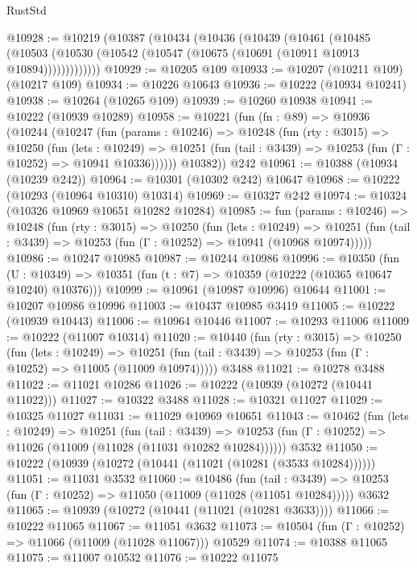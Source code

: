 \begin{lexlean}{RustStd}
\begin{coremodule}
@10928 := @10219
    (@10387
      (@10434
        (@10436
          (@10439
            (@10461
              (@10485
                (@10503 (@10530 (@10542 (@10547 (@10675 (@10691 (@10911 @10913 @10894)))))))))))))
@10929 := @10205 @109
@10933 := @10207 (@10211 @109) (@10217 @109)
@10934 := @10226 @10643
@10936 := @10222 (@10934 @10241)
@10938 := @10264 (@10265 @109)
@10939 := @10260 @10938
@10941 := @10222 (@10939 @10289)
@10958 := @10221
    (fun (fn : @89) =>
    @10936
      (@10244
        (@10247
          (fun (params : @10246) =>
          @10248
            (fun (rty : @3015) =>
            @10250
              (fun (lets : @10249) =>
              @10251 (fun (tail : @3439) => @10253 (fun (Γ : @10252) => @10941 @10336))))))
        @10382))
    @242
@10961 := @10388 (@10934 (@10239 @242))
@10964 := @10301 (@10302 @242) @10647
@10968 := @10222 (@10293 (@10964 @10310) @10314)
@10969 := @10327 @242
@10974 := @10324 (@10326 @10969 @10651 @10282 @10284)
@10985 := fun (params : @10246) =>
  @10248
    (fun (rty : @3015) =>
    @10250
      (fun (lets : @10249) =>
      @10251 (fun (tail : @3439) => @10253 (fun (Γ : @10252) => @10941 (@10968 @10974)))))
@10986 := @10247 @10985
@10987 := @10244 @10986
@10996 := @10350
    (fun (U : @10349) => @10351 (fun (t : @7) => @10359 (@10222 (@10365 @10647 @10240) @10376)))
@10999 := @10961 (@10987 @10996) @10644
@11001 := @10207 @10986 @10996
@11003 := @10437 @10985 @3419
@11005 := @10222 (@10939 @10443)
@11006 := @10964 @10446
@11007 := @10293 @11006
@11009 := @10222 (@11007 @10314)
@11020 := @10440
    (fun (rty : @3015) =>
    @10250
      (fun (lets : @10249) =>
      @10251 (fun (tail : @3439) => @10253 (fun (Γ : @10252) => @11005 (@11009 @10974)))))
    @3488
@11021 := @10278 @3488
@11022 := @11021 @10286
@11026 := @10222 (@10939 (@10272 (@10441 @11022)))
@11027 := @10322 @3488
@11028 := @10321 @11027
@11029 := @10325 @11027
@11031 := @11029 @10969 @10651
@11043 := @10462
    (fun (lets : @10249) =>
    @10251
      (fun (tail : @3439) =>
      @10253 (fun (Γ : @10252) => @11026 (@11009 (@11028 (@11031 @10282 @10284))))))
    @3532
@11050 := @10222 (@10939 (@10272 (@10441 (@11021 (@10281 (@3533 @10284))))))
@11051 := @11031 @3532
@11060 := @10486
    (fun (tail : @3439) => @10253 (fun (Γ : @10252) => @11050 (@11009 (@11028 (@11051 @10284)))))
    @3632
@11065 := @10939 (@10272 (@10441 (@11021 (@10281 @3633))))
@11066 := @10222 @11065
@11067 := @11051 @3632
@11073 := @10504 (fun (Γ : @10252) => @11066 (@11009 (@11028 @11067))) @10529
@11074 := @10388 @11065
@11075 := @11007 @10532
@11076 := @10222 @11075

\end{coremodule}
\end{lexlean}
